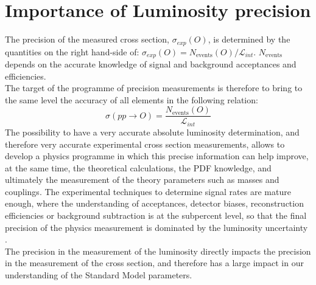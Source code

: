 



\section{Importance of Luminosity precision}

The precision of the measured cross section, $\sigma_{exp}(O)$, is determined by the quantities on the right hand-side of: $\sigma_{exp}(O) = N_{\text{events}}(O)/\mathcal{L}_{int}$. $N_{\text{events}}$ depends on the accurate knowledge of signal and background acceptances and efficiencies. \\
The target of the programme of precision measurements is therefore to bring to the same level the accuracy of all elements in the following relation:
$$\sigma (pp \rightarrow O)= \frac{N_{\text{events}}(O)}{\mathcal{L}_{int}}$$
The possibility to have a very accurate absolute luminosity determination, and therefore very accurate experimental cross section measurements, allows to develop a physics programme in which this precise information can help improve, at the same time, the theoretical calculations, the PDF knowledge, and ultimately the measurement of the theory parameters such as masses and couplings\cite{lumi_motiv}. 
The experimental techniques to determine signal rates are mature enough, where the understanding of acceptances, detector biases, reconstruction efficiencies or background subtraction is at the subpercent level, so that the final precision of the physics measurement is dominated by the luminosity uncertainty \cite{lumi_paper_def_and_concept}. \\
The precision in the measurement of the luminosity directly impacts the precision in the measurement of the cross section, and therefore has a large impact in our understanding of the Standard Model parameters.



